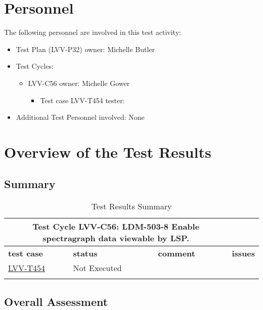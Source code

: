 \documentclass[DM,lsstdraft,STR,toc]{lsstdoc}
\begin{document}
\section{Personnel}
\label{sect:personnel}

The following personnel are involved in this test activity:

\begin{itemize}
\item Test Plan (LVV-P32) owner: Michelle Butler
\item Test Cycles:
\begin{itemize}
  \item LVV-C56 owner: 
    Michelle Gower
  \begin{itemize}
    \item Test case LVV-T454 tester: 
  \end{itemize}
\end{itemize}
\item Additional Test Personnel involved: None
\end{itemize}

\newpage

\section{Overview of the Test Results}
\label{sect:overview}

\subsection{Summary}
\label{sect:summarytable}

\begin{longtable}{p{}p{}p{}p{}}
\toprule
  \multicolumn{3}{c}{ Test Cycle {\bf LVV-C56: LDM-503-8 Enable spectragraph data viewable by LSP.
 }} \\\hline
  {\bf \footnotesize test case} & {\bf \footnotesize status} & {\bf \footnotesize comment} & {\bf \footnotesize issues} \\\toprule
    \href{https://jira.lsstcorp.org/secure/Tests.jspa#/testCase/LVV-T454}{LVV-T454} 
    & Not Executed &  &
    \\\hline

\caption{Test Results Summary}
\label{table:summary}
\end{longtable}

\subsection{Overall Assessment}
\label{sect:overallassessment}
\end{document}
